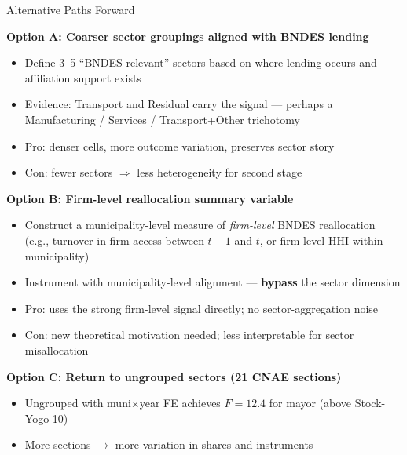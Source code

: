\documentclass[aspectratio=169,11pt]{beamer}
\begin{document}
\begin{frame}[shrink=8]{Alternative Paths Forward}

\textbf{Option A: Coarser sector groupings aligned with BNDES lending}
\begin{itemize}\setlength{\itemsep}{1pt}
    \item Define 3--5 ``BNDES-relevant'' sectors based on where lending occurs and affiliation support exists
    \item Evidence: Transport and Residual carry the signal --- perhaps a Manufacturing / Services / Transport+Other trichotomy
    \item \textcolor{notegreen}{Pro}: denser cells, more outcome variation, preserves sector story
    \item \textcolor{alertred}{Con}: fewer sectors $\Rightarrow$ less heterogeneity for second stage
\end{itemize}

\smallskip

\textbf{Option B: Firm-level reallocation summary variable}
\begin{itemize}\setlength{\itemsep}{1pt}
    \item Construct a municipality-level measure of \emph{firm-level} BNDES reallocation (e.g., turnover in firm access between $t{-}1$ and $t$, or firm-level HHI within municipality)
    \item Instrument with municipality-level alignment --- \textbf{bypass} the sector dimension
    \item \textcolor{notegreen}{Pro}: uses the strong firm-level signal directly; no sector-aggregation noise
    \item \textcolor{alertred}{Con}: new theoretical motivation needed; less interpretable for sector misallocation
\end{itemize}

\smallskip

\textbf{Option C: Return to ungrouped sectors (21 CNAE sections)}
\begin{itemize}\setlength{\itemsep}{1pt}
    \item Ungrouped with muni$\times$year FE achieves $F = 12.4$ for mayor (above Stock-Yogo 10)
    \item More sections $\to$ more variation in shares and instruments
\end{itemize}

\end{frame}
\end{document}
